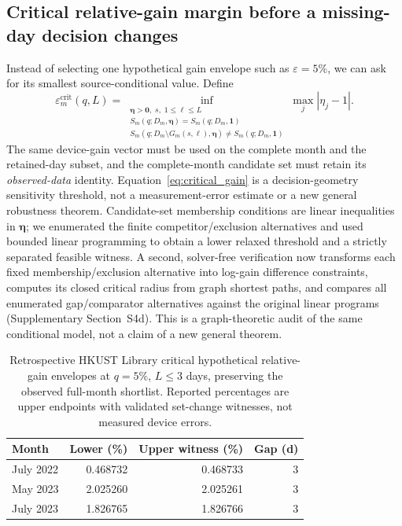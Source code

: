 \documentclass[preprint,12pt]{elsarticle}
\begin{document}
\subsection{Critical relative-gain margin before a missing-day decision changes}
Instead of selecting one hypothetical gain envelope such as $\varepsilon=5\%$, we can ask for its smallest source-conditional value. Define
\begin{equation}
\varepsilon_m^{\mathrm{crit}}(q,L)=
\inf_{\substack{\boldsymbol{\eta}>\boldsymbol{0},\;s,\;1\leq\ell\leq L\\
S_m(q;D_m,\boldsymbol{\eta})=S_m(q;D_m,\boldsymbol{1})\\
S_m(q;D_m\setminus G_m(s,\ell),\boldsymbol{\eta})
\ne S_m(q;D_m,\boldsymbol{1})}}
\max_j|\eta_j-1|.
\label{eq:critical_gain}
\end{equation}
The same device-gain vector must be used on the complete month and the retained-day subset, and the complete-month candidate set must retain its \emph{observed-data} identity. Equation~\eqref{eq:critical_gain} is a decision-geometry sensitivity threshold, not a measurement-error estimate or a new general robustness theorem. Candidate-set membership conditions are linear inequalities in $\boldsymbol{\eta}$; we enumerated the finite competitor/exclusion alternatives and used bounded linear programming to obtain a lower relaxed threshold and a strictly separated feasible witness. A second, solver-free verification now transforms each fixed membership/exclusion alternative into log-gain difference constraints, computes its closed critical radius from graph shortest paths, and compares all enumerated gap/comparator alternatives against the original linear programs (Supplementary Section~S4d). This is a graph-theoretic audit of the same conditional model, not a claim of a new general theorem.

\begin{table}[H]
\centering
\caption{Retrospective HKUST Library critical hypothetical relative-gain envelopes at $q=5\%$, $L\leq3$ days, preserving the observed full-month shortlist. Reported percentages are upper endpoints with validated set-change witnesses, not measured device errors.}
\label{tab:hkustcritical}
\small
\begin{tabular}{lrrr}
\toprule
Month & Lower (\%) & Upper witness (\%) & Gap (d)\\
\midrule
July 2022 & 0.468732 & 0.468733 & 3 \\
May 2023 & 2.025260 & 2.025261 & 3 \\
July 2023 & 1.826765 & 1.826766 & 3 \\
\bottomrule
\end{tabular}
\end{table}
\end{document}
